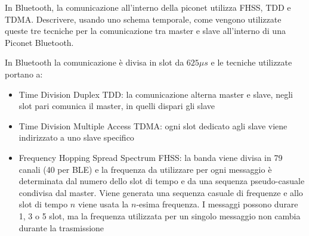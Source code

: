 \begin{questions}
    \question In Bluetooth, la comunicazione all'interno della piconet utilizza FHSS, TDD e TDMA. Descrivere, usando uno schema temporale, come vengono utilizzate queste tre tecniche per la comunicazione tra master e slave all'interno di una Piconet Bluetooth.
    
    \begin{solution}
        In Bluetooth la comunicazione è divisa in slot da $625 \mu s$ e le tecniche utilizzate portano a: 
        \begin{itemize}
            \item Time Division Duplex TDD: la comunicazione alterna master e slave, negli slot pari comunica il master, in quelli dispari gli slave
            
            \item Time Division Multiple Access TDMA: ogni slot dedicato agli slave viene indirizzato a uno slave specifico
            
            \item Frequency Hopping Spread Spectrum FHSS: la banda viene divisa in 79 canali (40 per BLE) e la frequenza da utilizzare per ogni messaggio è determinata dal numero dello slot di tempo e da una sequenza pseudo-casuale condivisa dal master. Viene generata una sequenza casuale di frequenze e allo slot di tempo $n$ viene usata la $n$-esima frequenza. I messaggi possono durare 1, 3 o 5 slot, ma la frequenza utilizzata per un singolo messaggio non cambia durante la trasmissione
        \end{itemize}
    \end{solution}
\end{questions}